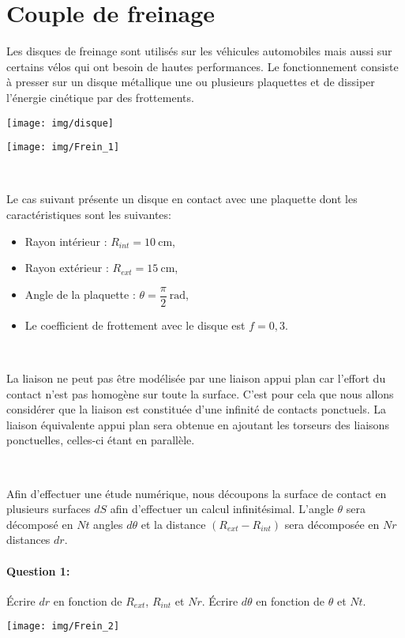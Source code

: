 

\section{Couple de freinage}

Les disques de freinage sont utilisés sur les véhicules automobiles mais aussi sur certains vélos qui ont besoin de hautes performances. Le fonctionnement consiste à presser sur un disque métallique une ou plusieurs plaquettes et de dissiper l'énergie cinétique par des frottements.

\begin{minipage}{0.47\linewidth}
 \centering\texttt{[image: img/disque]}
\end{minipage}\hfill
\begin{minipage}{0.47\linewidth}
 \centering\texttt{[image: img/Frein\_1]}
\end{minipage}

~\

Le cas suivant présente un disque en contact avec une plaquette dont les caractéristiques sont les suivantes:
\begin{itemize}
 \item Rayon intérieur : $R_{int}=\SI{10}{\centi\meter}$,
 \item Rayon extérieur : $R_{ext}=\SI{15}{\centi\meter}$,
 \item Angle de la plaquette : $\theta=\dfrac{\pi}{2}\ \mathrm{rad}$,
 \item Le coefficient de frottement avec le disque est $f=0,3$.
\end{itemize}

~\

La liaison ne peut pas être modélisée par une liaison appui plan car l'effort du contact n'est pas homogène sur toute la surface. C'est pour cela que nous allons considérer que la liaison est constituée d'une infinité de contacts ponctuels. La liaison équivalente appui plan sera obtenue en ajoutant les torseurs des liaisons ponctuelles, celles-ci étant en parallèle.

~\

\begin{minipage}{0.47\linewidth}
Afin d'effectuer une étude numérique, nous découpons la surface de contact en plusieurs surfaces $dS$ afin d'effectuer un calcul infinitésimal. L'angle $\theta$ sera décomposé en $Nt$ angles $d\theta$ et la distance $(R_{ext}-R_{int})$ sera décomposée en $Nr$ distances $dr$.

\paragraph{Question 1:} Écrire $dr$ en fonction de $R_{ext}$, $R_{int}$ et $Nr$. Écrire $d\theta$ en fonction de $\theta$ et $Nt$.
\end{minipage}\hfill
\begin{minipage}{0.47\linewidth}
 \centering\texttt{[image: img/Frein\_2]}
\end{minipage}

